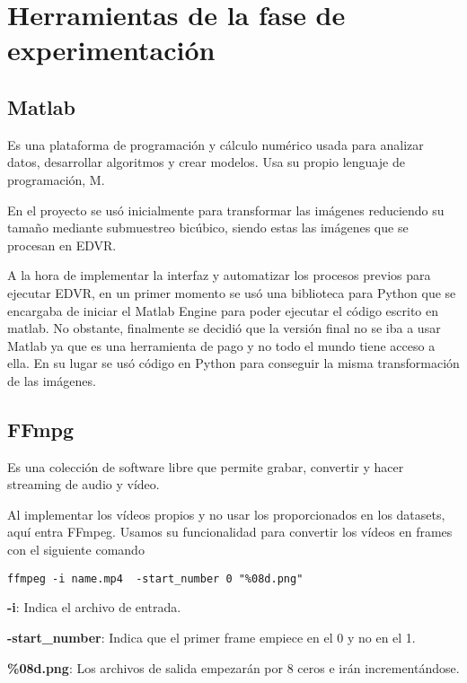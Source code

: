 \section{Herramientas de la fase de experimentación}
    
    \subsection{Matlab}
    Es una plataforma de programación y cálculo numérico usada para analizar datos, desarrollar algoritmos y crear modelos. Usa su propio lenguaje de programación, M. 
    

    En el proyecto se usó inicialmente para transformar las imágenes reduciendo su tamaño mediante submuestreo bicúbico, siendo estas las imágenes que se procesan en EDVR.
    
    A la hora de  implementar la interfaz y automatizar los procesos previos para ejecutar EDVR, en un primer momento se usó una biblioteca para Python que se encargaba de iniciar el Matlab Engine para poder ejecutar el código escrito en matlab. No obstante, finalmente se decidió que la versión final no se iba a usar Matlab ya que es una herramienta de pago y no todo el mundo tiene acceso a ella. En su lugar se usó código en Python para conseguir la misma transformación de las imágenes.

    \subsection{FFmpg}
    Es una colección de software libre que permite grabar, convertir y hacer streaming de audio y vídeo.
    
    Al implementar los vídeos propios y no usar los proporcionados en los datasets, aquí entra FFmpeg. Usamos su funcionalidad para convertir los vídeos en frames con el siguiente comando
    
    \verb|ffmpeg -i name.mp4  -start_number 0 "%08d.png"|
    
    \textbf{-i}: Indica el archivo de entrada.
    
    \textbf{-start\_number}: Indica que el primer frame empiece en el 0 y no en el 1.
    
    \textbf{\%08d.png}: Los archivos de salida empezarán por 8 ceros e irán incrementándose.
    

